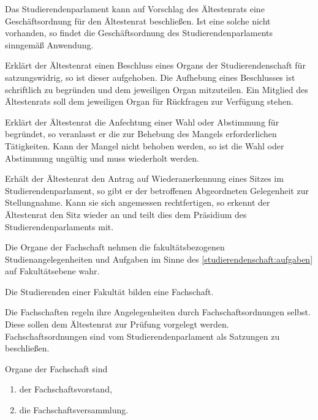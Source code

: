 \begin{jurdoc}
Das Studierendenparlament kann auf Vorschlag des Ältestenrats eine Geschäftsordnung für den Ältestenrat beschließen. Ist eine solche nicht vorhanden, so findet die Ge\-schäfts\-ord\-nung des Studierendenparlaments sinngemäß Anwendung.



Erklärt der Ältestenrat einen Beschluss eines Organs der Studierendenschaft für satzungswidrig, so ist dieser aufgehoben. Die Aufhebung eines Beschlusses ist schriftlich zu begründen und dem jeweiligen Organ mitzuteilen. Ein Mitglied des Ältestenrats soll dem jeweiligen Organ für Rückfragen zur Verfügung stehen.

Erklärt der Ältestenrat die Anfechtung einer Wahl oder Abstimmung für begründet, so veranlasst er die zur Behebung des Mangels erforderlichen Tätigkeiten. Kann der Mangel nicht behoben werden, so ist die Wahl oder Abstimmung ungültig und muss wiederholt werden.

Erhält der Ältestenrat den Antrag auf Wiederanerkennung eines Sitzes im Studierendenparlament, so gibt er der betroffenen Abgeordneten Gelegenheit zur Stellungnahme. Kann sie sich angemessen rechtfertigen, so erkennt der Ältestenrat den Sitz wieder an und teilt dies dem Präsidium des Studierendenparlaments mit.


%
%


 \label{fachschaften:aufgaben}

Die Organe der Fachschaft nehmen die fakultätsbezogenen Studienangelegenheiten und Aufgaben im Sinne des \ref{studierendenschaft:aufgaben} auf Fakultätsebene wahr.

\label{fachschaften:gliederung}

Die Studierenden einer Fakultät bilden eine Fachschaft.

Die Fachschaften regeln ihre Angelegenheiten durch Fachschaftsordnungen selbst. Diese sollen dem Ältestenrat zur Prüfung vorgelegt werden. Fachschaftsordnungen sind vom Studierendenparlament als Satzungen zu beschließen.



Organe der Fachschaft sind
  \begin{enumerate}
  \item der Fachschaftsvorstand,
  \item die Fachschaftsversammlung.
  \end{enumerate}


\end{jurdoc}
